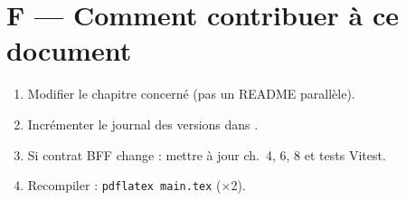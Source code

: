 \section{F --- Comment contribuer à ce document}

\begin{enumerate}
  \item Modifier le chapitre concerné (pas un README parallèle).
  \item Incrémenter le journal des versions dans .
  \item Si contrat BFF change : mettre à jour ch.~4, 6, 8 et tests Vitest.
  \item Recompiler : \texttt{pdflatex main.tex} (×2).
\end{enumerate}
